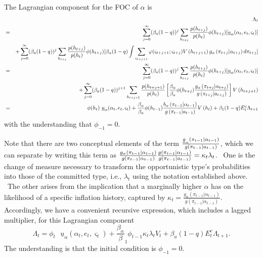 \documentclass[12pt,letter,leqno]{article}
\theoremstyle{asn}
\theoremstyle{lem}
\theoremstyle{slem}
\theoremstyle{prop}
\theoremstyle{appprop}
\theoremstyle{rem}
\theoremstyle{defn}
\begin{document}
\begin{oldversion}
The Lagrangian component for the FOC of $\alpha $ is%
\begin{eqnarray*}
&&\Lambda _{t} \\
&=&\sum_{j=0}^{\infty }(\beta_{a}(1-q))^{j}\sum_{h_{t+j}}\frac{p(h_{t+j})}{%
p(h_{t})}\phi (h_{t+j})[\underline{u}_{\alpha }(\alpha _{t},e_{t},\varsigma
_{t})] \\
&&+\sum_{j=0}^{\infty }(\beta_{a}(1-q))^{j}\sum_{h_{t+j}}\frac{p(h_{t+j})}{%
p(h_{t})}\phi (h_{t+j})[\beta_{\alpha}(1-q)\int \sum_{\varsigma
_{t+j+1}}\varphi (\varsigma _{t+j+1};\varsigma _{t+j})V\left(
h_{t+j+1}\right) g_{\alpha }\left( \pi _{t+j}|\alpha
_{t+j}\right) d\pi _{t+j}] \\
&=&\sum_{j=0}^{\infty }(\beta_{a}(1-q))^{j}\sum_{h_{t+j}}\frac{p(h_{t+j})}{%
p(h_{t})}\phi (h_{t+j})[\underline{u}_{\alpha }(\alpha _{t},e_{t},\varsigma
_{t})] \\
&&+\sum_{j=0}^{\infty }(\beta_{a}(1-q))^{j+1}\sum_{h_{t+j+1}}\frac{%
p(h_{t+j+1})}{p(h_{t})}\left[ \frac{\beta_{\alpha}}{\beta_{a}}\phi
(h_{t+j})\frac{g_{\alpha }\left( \pi _{t+j}|\alpha
_{t+j}\right) }{g\left( \pi _{t+j}|a_{t+j}\right) }\right] V%
\left( h_{t+j+1}\right) \\
&=&\phi (h_{t})\text{ }\underline{u}_{\alpha }(\alpha _{t},e_{t},\varsigma
_{t})+\frac{\beta_{\alpha}}{\beta_{a}}\phi (h_{t-1})%
\frac{b_{\alpha }\left( \pi _{t-1}|\alpha _{t-1}\right) }{%
g\left( \pi _{t-1}|a_{t-1}\right) }V\left( h_{t}\right) +\beta
_{1}(1-q)E_{t}^{c}\Lambda _{t+1}
\end{eqnarray*}%
with the understanding that $\phi _{-1}=0$.

Note that there are two conceptual elements of the term $\frac{\uline{g}%
_{\alpha }\left( \pi _{t-1}|\alpha _{t-1}\right) }{g\left( \pi
_{t-1}|a_{t-1}\right) }$, which we can separate by writing this term as $%
\frac{g_{\alpha }\left( \pi _{t-1}|\alpha _{t-1}\right) }{%
g\left( \pi _{t-1}|\alpha _{t-1}\right) }\frac{g\left( \pi
_{t-1}|\alpha _{t-1}\right) }{g\left( \pi _{t-1}|a_{t-1}\right) }=\kappa
_{t}\lambda _{t}$. \ One is the change of measure necessary to transform the
opportunistic type's probabilities into those of the committed type, i.e., $%
\lambda _{t}$ using the notation established above. \ The other arises from
the implication that a marginally higher $\alpha $ has on the likelihood of
a specific inflation history, captured by $\kappa _{t}=\frac{g%
_{\alpha }\left( \pi _{t-1}|\alpha _{t-1}\right) }{g\left( \pi _{t-1}|\alpha
_{t-1}\right) }$. Accordingly, we have a convenient recursive expression,
which includes a lagged multiplier, for this Lagrangian component 
\begin{equation}
\Lambda _{t}=\phi _{t}\text{ }\underline{u}_{\alpha }(\alpha
_{t},e_{t},\varsigma _{t})+\frac{\beta_{\alpha}}\beta
_{1}\phi _{t-1}\kappa _{t}\lambda _{t}V_{t}+\beta_{a}(1-q)E_{t}^{c}\Lambda
_{t+1}\text{.}  \label{OMrecursive}
\end{equation}%
The understanding is that the initial condition is $\phi _{-1}=0$.


\end{oldversion}
\end{document}
